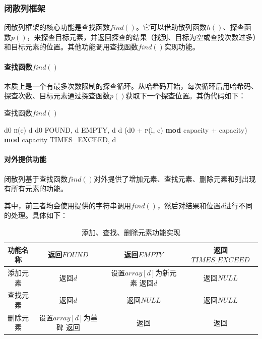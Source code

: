 \documentclass[scheme = chinese]{ctexart}
\begin{document}
\subsubsection{闭散列框架}
闭散列框架的核心功能是查找函数$find()$。它可以借助散列函数$h()$、探查函数$p()$，来探查目标元素，并返回探查的结果（找到、目标为空或查找次数过多）和目标元素的位置。其他功能调用查找函数$find()$实现功能。

\paragraph{查找函数$find()$} 本质上是一个有最多次数限制的探查循环。从哈希码开始，每次循环后用哈希码、探查次数、目标元素通过探查函数$p()$获取下一个探查位置。其伪代码如下：

\begin{algorithm}[H]
    \caption{查找函数$find()$}
    \begin{algorithmic}[1]
            \State d0 \gets \textsc{h}(e)
            \State d \gets d0
                    \State \Return FOUND, d
                    \State \Return EMPTY, d
                \EndIf
                \State d \gets (d0 + \textsc{p}(i, e) \textbf{mod} capacity + capacity) \textbf{mod} capacity
            \EndFor
            \State \Return TIMES\_EXCEED, d
        \EndFunction
    \end{algorithmic}
\end{algorithm}

\paragraph{对外提供功能} 闭散列基于查找函数$find()$对外提供了增加元素、查找元素、删除元素和列出现有所有元素的功能。

其中，前三者均会使用提供的字符串调用$find()$，然后对结果和位置$d$进行不同的处理。具体如下：
\begin{table}[H]
    \centering
    \caption{添加、查找、删除元素功能实现}
    \begin{tabular}{cccc}
        \toprule
        功能名称 & 返回$FOUND$ & 返回$EMPTY$ & 返回$TIMES\_EXCEED$ \\
        \midrule
        添加元素 & 返回$d$ & \makecell[c]{
            设置$array[d]$为新元素 \\
            返回$d$ \\
        } & 返回$NULL$ \\
        \midrule
        查找元素 & 返回$d$ & 返回$NULL$ & 返回$NULL$ \\
        \midrule
        删除元素 & \makecell[c]{
            设置$array[d]$为墓碑 \\
            返回 \\
        } & 返回 & 返回 \\
        \bottomrule
    \end{tabular}
\end{table}
\end{document}
